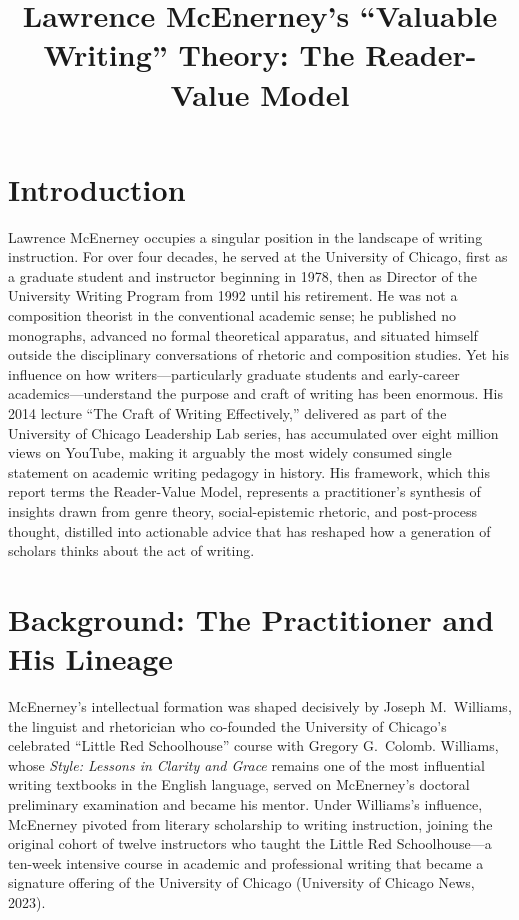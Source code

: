 \documentclass[12pt]{article}
\title{Lawrence McEnerney's ``Valuable Writing'' Theory: The Reader-Value Model}
\author{}
\date{}
\begin{document}
\maketitle

\section*{Introduction}

Lawrence McEnerney occupies a singular position in the landscape of writing instruction. For over four decades, he served at the University of Chicago, first as a graduate student and instructor beginning in 1978, then as Director of the University Writing Program from 1992 until his retirement. He was not a composition theorist in the conventional academic sense; he published no monographs, advanced no formal theoretical apparatus, and situated himself outside the disciplinary conversations of rhetoric and composition studies. Yet his influence on how writers---particularly graduate students and early-career academics---understand the purpose and craft of writing has been enormous. His 2014 lecture ``The Craft of Writing Effectively,'' delivered as part of the University of Chicago Leadership Lab series, has accumulated over eight million views on YouTube, making it arguably the most widely consumed single statement on academic writing pedagogy in history. His framework, which this report terms the Reader-Value Model, represents a practitioner's synthesis of insights drawn from genre theory, social-epistemic rhetoric, and post-process thought, distilled into actionable advice that has reshaped how a generation of scholars thinks about the act of writing.

\section*{Background: The Practitioner and His Lineage}

McEnerney's intellectual formation was shaped decisively by Joseph M.~Williams, the linguist and rhetorician who co-founded the University of Chicago's celebrated ``Little Red Schoolhouse'' course with Gregory G.~Colomb. Williams, whose \textit{Style: Lessons in Clarity and Grace} remains one of the most influential writing textbooks in the English language, served on McEnerney's doctoral preliminary examination and became his mentor. Under Williams's influence, McEnerney pivoted from literary scholarship to writing instruction, joining the original cohort of twelve instructors who taught the Little Red Schoolhouse---a ten-week intensive course in academic and professional writing that became a signature offering of the University of Chicago (University of Chicago News, 2023).
\end{document}
